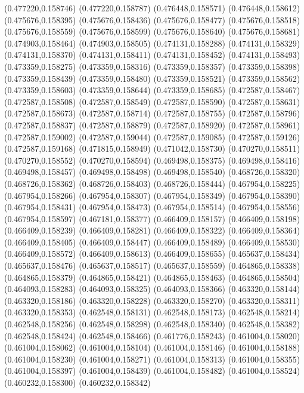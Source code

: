 (0.477220,0.158746)
(0.477220,0.158787)
(0.476448,0.158571)
(0.476448,0.158612)
(0.475676,0.158395)
(0.475676,0.158436)
(0.475676,0.158477)
(0.475676,0.158518)
(0.475676,0.158559)
(0.475676,0.158599)
(0.475676,0.158640)
(0.475676,0.158681)
(0.474903,0.158464)
(0.474903,0.158505)
(0.474131,0.158288)
(0.474131,0.158329)
(0.474131,0.158370)
(0.474131,0.158411)
(0.474131,0.158452)
(0.474131,0.158493)
(0.473359,0.158275)
(0.473359,0.158316)
(0.473359,0.158357)
(0.473359,0.158398)
(0.473359,0.158439)
(0.473359,0.158480)
(0.473359,0.158521)
(0.473359,0.158562)
(0.473359,0.158603)
(0.473359,0.158644)
(0.473359,0.158685)
(0.472587,0.158467)
(0.472587,0.158508)
(0.472587,0.158549)
(0.472587,0.158590)
(0.472587,0.158631)
(0.472587,0.158673)
(0.472587,0.158714)
(0.472587,0.158755)
(0.472587,0.158796)
(0.472587,0.158837)
(0.472587,0.158879)
(0.472587,0.158920)
(0.472587,0.158961)
(0.472587,0.159002)
(0.472587,0.159044)
(0.472587,0.159085)
(0.472587,0.159126)
(0.472587,0.159168)
(0.471815,0.158949)
(0.471042,0.158730)
(0.470270,0.158511)
(0.470270,0.158552)
(0.470270,0.158594)
(0.469498,0.158375)
(0.469498,0.158416)
(0.469498,0.158457)
(0.469498,0.158498)
(0.469498,0.158540)
(0.468726,0.158320)
(0.468726,0.158362)
(0.468726,0.158403)
(0.468726,0.158444)
(0.467954,0.158225)
(0.467954,0.158266)
(0.467954,0.158307)
(0.467954,0.158349)
(0.467954,0.158390)
(0.467954,0.158431)
(0.467954,0.158473)
(0.467954,0.158514)
(0.467954,0.158556)
(0.467954,0.158597)
(0.467181,0.158377)
(0.466409,0.158157)
(0.466409,0.158198)
(0.466409,0.158239)
(0.466409,0.158281)
(0.466409,0.158322)
(0.466409,0.158364)
(0.466409,0.158405)
(0.466409,0.158447)
(0.466409,0.158489)
(0.466409,0.158530)
(0.466409,0.158572)
(0.466409,0.158613)
(0.466409,0.158655)
(0.465637,0.158434)
(0.465637,0.158476)
(0.465637,0.158517)
(0.465637,0.158559)
(0.464865,0.158338)
(0.464865,0.158379)
(0.464865,0.158421)
(0.464865,0.158463)
(0.464865,0.158504)
(0.464093,0.158283)
(0.464093,0.158325)
(0.464093,0.158366)
(0.463320,0.158144)
(0.463320,0.158186)
(0.463320,0.158228)
(0.463320,0.158270)
(0.463320,0.158311)
(0.463320,0.158353)
(0.462548,0.158131)
(0.462548,0.158173)
(0.462548,0.158214)
(0.462548,0.158256)
(0.462548,0.158298)
(0.462548,0.158340)
(0.462548,0.158382)
(0.462548,0.158424)
(0.462548,0.158466)
(0.461776,0.158243)
(0.461004,0.158020)
(0.461004,0.158062)
(0.461004,0.158104)
(0.461004,0.158146)
(0.461004,0.158188)
(0.461004,0.158230)
(0.461004,0.158271)
(0.461004,0.158313)
(0.461004,0.158355)
(0.461004,0.158397)
(0.461004,0.158439)
(0.461004,0.158482)
(0.461004,0.158524)
(0.460232,0.158300)
(0.460232,0.158342)
